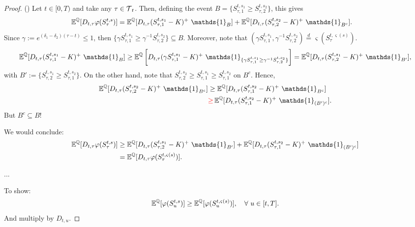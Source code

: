 \begin{proof} ()
Let $t\in [0,T)$ and take any $\tau \in \operatorname{\mathcal{T}}_t$. Then, defining the event $B = \{S^{t,s_1}_{\tau,1} \ge  S^{t,s_2}_{\tau,2}\}$, this gives
\begin{align*}
    \E^{\Q}[D_{t,\tau} \varphi(S^{t,s}_{\tau}) ] &= \E^{\Q}[D_{t,\tau} (S^{t,s_1}_{\tau,1}-K)^+ \ \mathds{1}_{B} ] + \E^{\Q}[D_{t,\tau} (S^{t,s_2}_{\tau,2}-K)^+ \ \mathds{1}_{B^c} ]. 
\end{align*}
Since $\gamma := e^{(\delta_1-\delta_2)(\tau-t)} \le 1$, then  $\{\gamma S^{t,s_1}_{\tau,1} \ge  \gamma^{-1} S^{t,s_2}_{\tau,2}\} \subseteq B$. Moreover, note that $(\gamma S^{t,s_1}_{\tau,1},\gamma^{-1} S^{t,s_2}_{\tau,2}) \overset{d}{=} \varsigma(S^{t,\varsigma(s)}_{\tau})$. 
\begin{equation*}
    \E^{\Q}[D_{t,\tau} (S^{t,s_1}_{\tau,1}-K)^+ \ \mathds{1}_{B} ] \ge  \E^{\Q}\left[D_{t,\tau} (\gamma S^{t,s_1}_{\tau,1}-K)^+ \ \mathds{1}_{\{\gamma S^{t,s_1}_{\tau,1} \ge  \gamma^{-1} S^{t,s_2}_{\tau,2}\}} \right ] = \E^{\Q}[D_{t,\tau} ( S^{t,s_1}_{\tau,2}-K)^+ \ \mathds{1}_{B'} ],
\end{equation*}
with $B':= \{ S^{t,s_1}_{\tau,2} \ge  S^{t,s_2}_{\tau,1}\}$. On the other hand, note that $S^{t,s_2}_{\tau,2} \ge S^{t,s_1}_{\tau,1} \ge S^{t,s_2}_{\tau,1} $ on $B^c$. Hence, 
\begin{align*}
    \E^{\Q}[D_{t,\tau} (S^{t,s_2}_{\tau,2}-K)^+ \ \mathds{1}_{B^c} ] &\ge  \E^{\Q}[D_{t,\tau} (S^{t,s_2}_{\tau,1}-K)^+ \ \mathds{1}_{B^c} ]\\
    &\rr{\ge} \E^{\Q}[D_{t,\tau} (S^{t,s_2}_{\tau,1}-K)^+ \ \mathds{1}_{(B')^c} ].
\end{align*}
But $B^c \subseteq B$!

We would conclude: 
\begin{align*}
    \E^{\Q}[D_{t,\tau} \varphi(S^{t,s}_{\tau}) ] &\ge \E^{\Q}[D_{t,\tau} ( S^{t,s_1}_{\tau,2}-K)^+ \ \mathds{1}_{B'} ] + \E^{\Q}[D_{t,\tau} (S^{t,s_2}_{\tau,1}-K)^+ \ \mathds{1}_{(B')^c} ]\\ 
    &= \E^{\Q}[D_{t,\tau} \varphi(S^{t,\varsigma(s)}_{\tau}) ]. 
\end{align*}

...

To show: 
$$\operatorname{\mathbb{E}}^{\operatorname{\mathbb{Q}}}[ \varphi(S^{t,s}_{u}) ] \ge \operatorname{\mathbb{E}}^{\operatorname{\mathbb{Q}}}[ \varphi(S^{t,\varsigma(s)}_{u}) ], \quad \forall \ u \in [t,T].  $$
And multiply by $D_{t,u}$. 


\end{proof}
